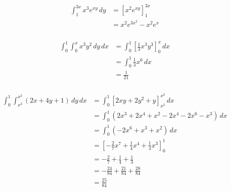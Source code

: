\documentclass{article}
\begin{document}
\setcounter{subsubsection}{2}
\subsubsection{}

\begin{align*}
  \int_1^{3 x} x^3 e^{x y} \,dy & = [x^2 e^{x y}]_1^{3 x}   \\
                                & = x^2 e^{3 x^2} - x^2 e^x
\end{align*}

\setcounter{subsubsection}{12}
\subsubsection{}

\begin{align*}
  \int_0^1 \int_0^x x^3 y^2 \,dy \,dx & = \int_0^1 \left[ \frac{1}{3} x^3 y^3 \right]_0^x \,dx \\
                                      & = \int_0^1 \frac{1}{3} x^6 \,dx                        \\
                                      & = \frac{1}{21}
\end{align*}

\setcounter{subsubsection}{14}
\subsubsection{}

\begin{align*}
  \int_0^1 \int_{x^3}^{x^2} (2 x + 4 y + 1) \,dy \,dx & = \int_0^1 [2 x y + 2 y^2 + y]_{x^3}^{x^2} \,dx                           \\
                                                      & = \int_0^1 (2 x^3 + 2 x^4 + x^2 - 2 x^4 - 2 x^6 - x^3) \,dx               \\
                                                      & = \int_0^1 (-2 x^6 + x^3 + x^2) \,dx                                      \\
                                                      & = \left[ -\frac{2}{7} x^7 + \frac{1}{4} x^4 + \frac{1}{3} x^3 \right]_0^1 \\
                                                      & = -\frac{2}{7} + \frac{1}{4} + \frac{1}{3}                                \\
                                                      & = -\frac{24}{84} + \frac{21}{84} + \frac{28}{84}                          \\
                                                      & = \frac{25}{84}
\end{align*}
\end{document}
